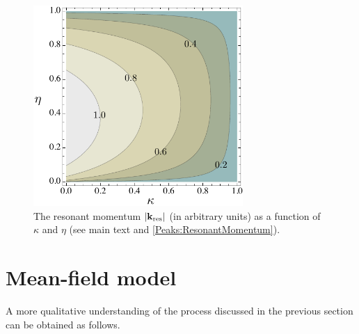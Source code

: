 \begin{figure}[tbp]
    \centering
        \includegraphics[height=3in]{ResonantMomentum}
    \caption{The resonant momentum $\left|\mathbf{k}_\text{res}\right|$ (in arbitrary units) as a function of $\kappa$ and $\eta$ (see main text and \eqref{Peaks:ResonantMomentum}).}
    \label{Peaks:ResonantMomentum}
\end{figure}



\section{Mean-field model}

A more qualitative understanding of the process discussed in the previous section can be obtained as follows.

